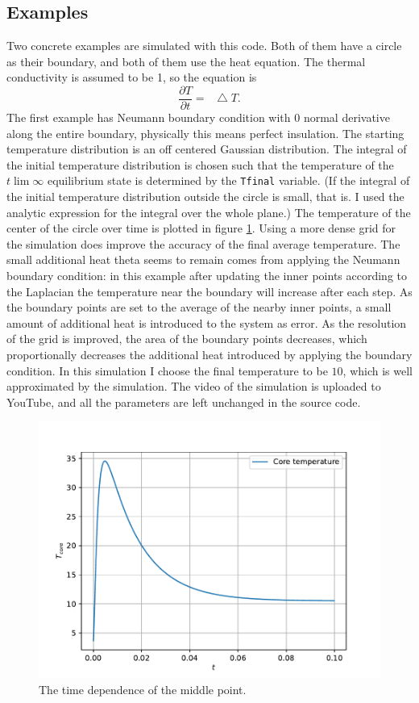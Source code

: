 \documentclass[pdftex,12pt,a4paper]{article}
\newcommand*\Laplace{\mathop{}\!\mathbin\bigtriangleup}
\begin{document}
	\subsection{Examples}
		Two concrete examples are simulated with this code. Both of them have a circle as their boundary, and both of them use the heat equation. The thermal conductivity is assumed to be 1, so the equation is
		\begin{equation}
			\frac{\partial T}{\partial t} = \Laplace T.
		\end{equation}
		The first example has Neumann boundary condition with 0 normal derivative along the entire boundary, physically this means perfect insulation. The starting temperature distribution is an off centered Gaussian distribution. The integral of the initial temperature distribution is chosen such that the temperature of the $t\lim\infty$ equilibrium state is determined by the \texttt{Tfinal} variable. (If the integral of the initial temperature distribution outside the circle is small, that is. I used the analytic expression for the integral over the whole plane.) The temperature of the center of the circle over time is plotted in figure \ref{timepdf}. Using a more dense grid for the simulation does improve the accuracy of the final average temperature. The small additional heat theta seems to remain comes from applying the Neumann boundary condition: in this example after updating the inner points according to the Laplacian the temperature near the boundary will increase after each step. As the boundary points are set to the average of the nearby inner points, a small amount of additional heat is introduced to the system as error. As the resolution of the grid is improved, the area of the boundary points decreases, which proportionally decreases the additional heat introduced by applying the boundary condition. In this simulation I choose the final temperature to be $10$, which is well approximated by the simulation. The video of the simulation is uploaded to YouTube, and all the parameters are left unchanged in the source code. \cite{gaussian}
		\begin{figure}[H]
			\centering
			\includegraphics[scale=1]{./figs/time.pdf}
			\caption{The time dependence of the middle point.}
			\label{timepdf}
		\end{figure}
\end{document}
